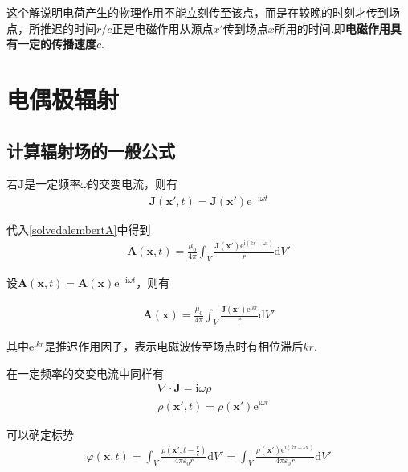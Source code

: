 \documentclass[main.tex]{subfiles}
\begin{document}
这个解说明电荷产生的物理作用不能立刻传至该点，而是在较晚的时刻才传到场点，所推迟的时间$r/c$正是电磁作用从源点$x'$传到场点$x$所用的时间.即\textbf{电磁作用具有一定的传播速度$c$}.

\section{电偶极辐射}
\subsection{计算辐射场的一般公式}
若$\boldsymbol{J}$是一定频率$\omega$的交变电流，则有
\begin{align}
    \boldsymbol{J}(\boldsymbol{x}',t) = \boldsymbol{J}(\boldsymbol{x}')\mathrm{e}^{-\mathrm{i}\omega t}
\end{align}

代入\ref{solvedalembertA}中得到
\begin{align}
    \boldsymbol{A}(\boldsymbol{x},t) = \frac{\mu _0}{4\pi } \int_V \frac{\displaystyle \boldsymbol{J}(\boldsymbol{x}')\mathrm{e}^{\mathrm{i}(kr-\omega t)}} {r} \mathrm{d}V'
\end{align}

设$\boldsymbol{A}(\boldsymbol{x},t) = \boldsymbol{A}(\boldsymbol{x})\mathrm{e}^{-\mathrm{i}\omega t}$，则有

\begin{align}
    \boldsymbol{A}(\boldsymbol{x}) = \frac{\mu _0}{4\pi } \int_V \frac{\displaystyle \boldsymbol{J}(\boldsymbol{x}')\mathrm{e}^{\mathrm{i}kr}} {r} \mathrm{d}V'
\end{align}

其中$\mathrm{e}^{\mathrm{i}kr}$是推迟作用因子，表示电磁波传至场点时有相位滞后$kr$.

在一定频率的交变电流中同样有
\begin{align}
    &\nabla \cdot \boldsymbol{J} = \mathrm{i} \omega \rho\\
    &\rho(\boldsymbol{x}',t) = \rho(\boldsymbol{x}') \mathrm{e}^{\mathrm{i}\omega t}
\end{align}

可以确定标势
\begin{align}
    \varphi(\boldsymbol{x},t) = \int_V \frac{\displaystyle \rho \left(\boldsymbol{x}' ,t - \frac{r}{c} \right)}{4\pi \varepsilon _0 r} \mathrm{d}V' = \int_V \frac{\displaystyle \rho (\boldsymbol{x}') \mathrm{e}^{\mathrm{i}(kr-\omega t)}}{4\pi \varepsilon _0 r}\mathrm{d}V'
\end{align}
\end{document}

